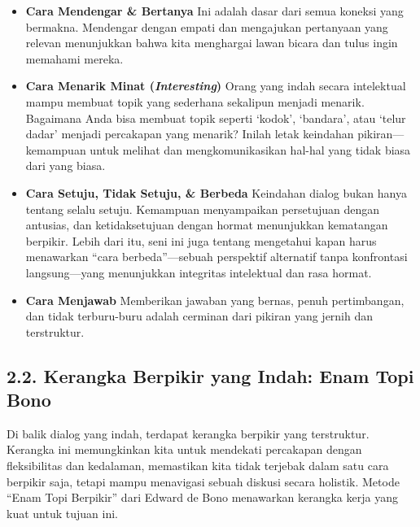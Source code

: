 \documentclass[
  letterpaper,
  DIV=11,
  numbers=noendperiod]{scrreprt}
\begin{document}
\begin{itemize}
\item
  \textbf{Cara Mendengar \& Bertanya} Ini adalah dasar dari semua
  koneksi yang bermakna. Mendengar dengan empati dan mengajukan
  pertanyaan yang relevan menunjukkan bahwa kita menghargai lawan bicara
  dan tulus ingin memahami mereka.
\item
  \textbf{Cara Menarik Minat (\emph{Interesting})} Orang yang indah
  secara intelektual mampu membuat topik yang sederhana sekalipun
  menjadi menarik. Bagaimana Anda bisa membuat topik seperti `kodok',
  `bandara', atau `telur dadar' menjadi percakapan yang menarik? Inilah
  letak keindahan pikiran---kemampuan untuk melihat dan
  mengkomunikasikan hal-hal yang tidak biasa dari yang biasa.
\item
  \textbf{Cara Setuju, Tidak Setuju, \& Berbeda} Keindahan dialog bukan
  hanya tentang selalu setuju. Kemampuan menyampaikan persetujuan dengan
  antusias, dan ketidaksetujuan dengan hormat menunjukkan kematangan
  berpikir. Lebih dari itu, seni ini juga tentang mengetahui kapan harus
  menawarkan ``cara berbeda''---sebuah perspektif alternatif tanpa
  konfrontasi langsung---yang menunjukkan integritas intelektual dan
  rasa hormat.
\item
  \textbf{Cara Menjawab} Memberikan jawaban yang bernas, penuh
  pertimbangan, dan tidak terburu-buru adalah cerminan dari pikiran yang
  jernih dan terstruktur.
\end{itemize}

\subsection{2.2. Kerangka Berpikir yang Indah: Enam Topi
Bono}\label{kerangka-berpikir-yang-indah-enam-topi-bono}

Di balik dialog yang indah, terdapat kerangka berpikir yang terstruktur.
Kerangka ini memungkinkan kita untuk mendekati percakapan dengan
fleksibilitas dan kedalaman, memastikan kita tidak terjebak dalam satu
cara berpikir saja, tetapi mampu menavigasi sebuah diskusi secara
holistik. Metode ``Enam Topi Berpikir'' dari Edward de Bono menawarkan
kerangka kerja yang kuat untuk tujuan ini.
\end{document}
